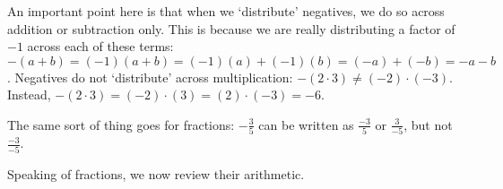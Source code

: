 \medskip

An important point here is that when we `distribute' negatives, we do so across addition or subtraction only.  This is because we are really distributing a factor of $-1$ across each of these terms:  $-(a+b) = (-1)(a+b) = (-1)(a) + (-1)(b) = (-a)+(-b) = -a-b$. Negatives do not `distribute' across multiplication:  $- (2 \cdot 3) \neq (-2)\cdot(-3)$. Instead, $-(2\cdot 3) = (-2)\cdot (3) = (2) \cdot (-3) = -6$.  

\medskip

The same sort of thing goes for fractions:  $- \frac{3}{5}$ can be written as $\frac{-3}{5}$ or $\frac{3}{-5}$, but not $\frac{-3}{-5}$.  

\pagebreak

Speaking of fractions, we now review their arithmetic.

\smallskip

\label{fractionarithmetic}


